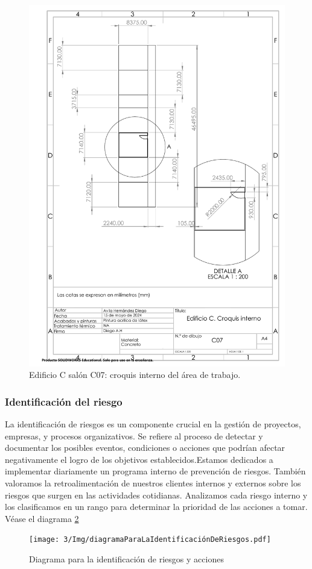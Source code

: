     \begin{figure}[H]
        \centering
        \includegraphics[scale=0.4]{3/Img/croquisInterno2.pdf}
        \caption{Edificio C salón C07: croquis interno del área de trabajo.} 
        \label{fig:croquis interno}
    \end{figure}
    \subsubsection{Identificación del riesgo}
    
    La identificación de riesgos es un componente crucial en la gestión de proyectos, empresas, y procesos organizativos. Se refiere al proceso de detectar y documentar los posibles eventos, condiciones o acciones que podrían afectar negativamente el logro de los objetivos establecidos.Estamos dedicados a implementar diariamente un programa interno de prevención de riesgos. También valoramos la retroalimentación de nuestros clientes internos y externos sobre los riesgos que surgen en las actividades cotidianas. Analizamos cada riesgo interno y los clasificamos en un rango para determinar la prioridad de las acciones a tomar. Véase el diagrama \ref{fig:diagrama}
    \begin{figure}[H]
        \centering
        \texttt{[image: 3/Img/diagramaParaLaIdentificaciónDeRiesgos.pdf]}
        \caption{Diagrama para la identificación de riesgos y acciones}
        \label{fig:diagrama}
    \end{figure}
